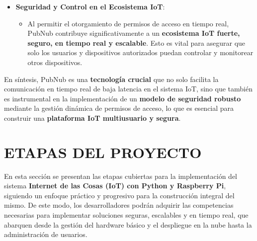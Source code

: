 \documentclass{report}
\begin{document}
\begin{itemize}
    \item \textbf{Seguridad y Control en el Ecosistema IoT}:
    \begin{itemize}
        \item Al permitir el otorgamiento de permisos de acceso en tiempo real, PubNub contribuye significativamente a un 
        \textbf{ecosistema IoT fuerte, seguro, en tiempo real y escalable}. Esto es vital para asegurar que solo los usuarios y 
        dispositivos autorizados puedan controlar y monitorear otros dispositivos.
    \end{itemize}
\end{itemize}
En síntesis, PubNub es una \textbf{tecnología crucial} que no solo facilita la comunicación en tiempo real de baja latencia en el 
sistema IoT, sino que también es instrumental en la implementación de un \textbf{modelo de seguridad robusto} mediante la gestión dinámica 
de permisos de acceso, lo que es esencial para construir una \textbf{plataforma IoT multiusuario y segura}.

\chapter{ETAPAS DEL PROYECTO}
En esta sección se presentan las etapas cubiertas para la implementación del sistema \textbf{Internet de las Cosas (IoT) con Python 
y Raspberry Pi}, siguiendo un enfoque práctico y progresivo para la construcción integral del mismo. De este modo, los 
desarrolladores podrán adquirir las competencias necesarias para implementar soluciones seguras, escalables y en tiempo real, que 
abarquen desde la gestión del hardware básico y el despliegue en la nube hasta la administración de usuarios.
\end{document}
